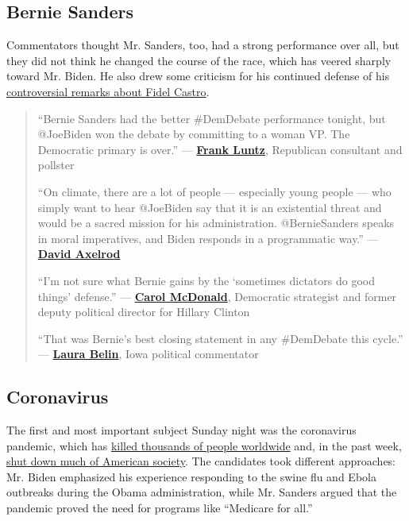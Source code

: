 \hypertarget{bernie-sanders}{%
\subsection{Bernie Sanders}\label{bernie-sanders}}

Commentators thought Mr. Sanders, too, had a strong performance over
all, but they did not think he changed the course of the race, which has
veered sharply toward Mr. Biden. He also drew some criticism for his
continued defense of his
\href{https://www.nytimes3xbfgragh.onion/2020/02/24/us/bernie-sanders-fidel-castro-florida.html}{controversial
remarks about Fidel Castro}.

\begin{quote}
``Bernie Sanders had the better \#DemDebate performance tonight, but
@JoeBiden won the debate by committing to a woman VP. The Democratic
primary is over.'' ---
\textbf{\href{https://twitter.com/FrankLuntz/status/1239371053383573505}{Frank
Luntz}}, Republican consultant and pollster

``On climate, there are a lot of people --- especially young people ---
who simply want to hear @JoeBiden say that it is an existential threat
and would be a sacred mission for his administration. @BernieSanders
speaks in moral imperatives, and Biden responds in a programmatic way.''
---
\textbf{\href{https://twitter.com/davidaxelrod/status/1239362267302498305}{David
Axelrod}}

``I'm not sure what Bernie gains by the `sometimes dictators do good
things' defense.'' ---
\textbf{\href{https://twitter.com/DCtwiterati/status/1239366512290521089}{Carol
McDonald}}, Democratic strategist and former deputy political director
for Hillary Clinton

``That was Bernie's best closing statement in any \#DemDebate this
cycle.'' ---
\textbf{\href{https://twitter.com/LauraRBelin/status/1239370437425090561}{Laura
Belin}}, Iowa political commentator
\end{quote}

\hypertarget{coronavirus}{%
\subsection{Coronavirus}\label{coronavirus}}

The first and most important subject Sunday night was the coronavirus
pandemic, which has
\href{https://www.nytimes3xbfgragh.onion/interactive/2020/world/coronavirus-maps.html}{killed
thousands of people worldwide} and, in the past week,
\href{https://www.nytimes3xbfgragh.onion/live/2020/coronavirus-usa}{shut
down much of American society}. The candidates took different
approaches: Mr. Biden emphasized his experience responding to the swine
flu and Ebola outbreaks during the Obama administration, while Mr.
Sanders argued that the pandemic proved the need for programs like
``Medicare for all.''

